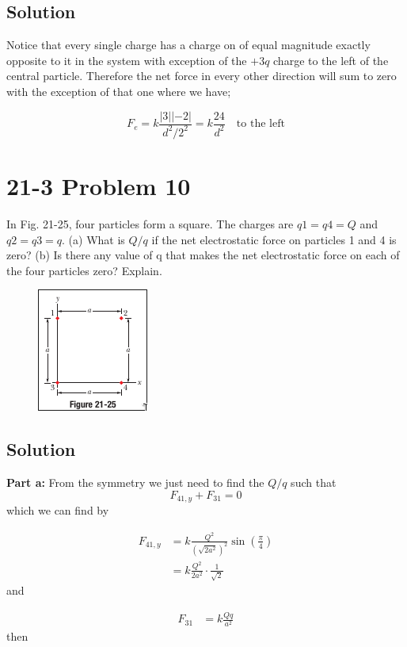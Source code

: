 \documentclass{article}
\begin{document}
\subsection*{Solution}
Notice that every single charge has a charge on of equal magnitude exactly opposite to it in the system with exception of the $+3q$ charge to the left of the central particle.
Therefore the net force in every other direction will sum to zero with the exception of that one where we have;

\[
    F_e = k \frac{|3||-2|}{d^2/2^2} = \boxed{k \frac{24}{d^2} \quad \text{to the left}}
\]

\section*{21-3 Problem 10}
In Fig. 21-25, four particles form a square. The charges are $q1 = q4 = Q$ and $q2 = q3 = q$. 
(a) What is $Q/q$ if the net electrostatic force on particles 1 and 4 is zero? 
(b) Is there any value of q that makes the net electrostatic force on each of the four particles zero? Explain.
 
\begin{figure}[ht]
    \centering
    \includegraphics[scale=0.75]{image-4.png}
\end{figure}

\subsection*{Solution}
\textbf{Part a:} From the symmetry we just need to find the $Q/q$ such that 
\[
    F_{41,y} + F_{31} = 0
\]
which we can find by

\begin{align*}
    F_{41,y} &= k \frac{Q^2}{\left(\sqrt{2a^2}\right)^2} \sin\left(\frac{\pi}{4}\right)\\
    &= k \frac{Q^2}{2a^2} \cdot \frac{1}{\sqrt{2}}
\end{align*}
and

\begin{align*}
    F_{31} &= k \frac{Qq}{a^2}
\end{align*}
then
\end{document}
